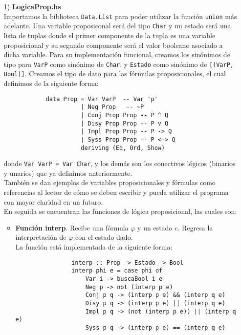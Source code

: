 \documentclass[letterpaper,12pt]{article}
\begin{document}
    \begin{itemize}
        \item[1)] \textbf{LogicaProp.hs} \\
        Importamos la biblioteca \texttt{Data.List} para poder utilizar 
        la función \texttt{union} más adelante. Una variable proposiconal 
        será del tipo \texttt{Char} y un estado será una lista de tuplas donde 
        el primer componente de la tupla es una variable proposicional y su 
        segundo componente será el valor booleano asociado a dicha variable.
        Para su implementación funcional, creamos los sinónimos de tipo para 
        \texttt{VarP} como sinónimo de \texttt{Char}, y \texttt{Estado} como 
        sinónimo de \texttt{[(VarP, Bool)]}. Creamos el tipo de dato para las 
        fórmulas proposicionales, el cual definimos de la siguiente forma:
        \begin{lstlisting}
            data Prop = Var VarP  -- Var 'p'
                      | Neg Prop   -- ~P
                      | Conj Prop Prop -- P ^ Q
                      | Disy Prop Prop -- P v Q
                      | Impl Prop Prop -- P -> Q
                      | Syss Prop Prop -- P <-> Q
                      deriving (Eq, Ord, Show)
        \end{lstlisting}

        donde \texttt{Var VarP = Var Char}, y los demás son los conectivos 
        lógicos (binarios y unarios) que ya definimos anteriormente. \\
        También se dan ejemplos de variables proposicionales y fórmulas 
        como referencias al lector de cómo se deben escribir y pueda utilizar 
        el programa con mayor claridad en un futuro. \\ 
        En seguida se encuentran las funciones de lógica proposicional, las
        cuales son:

        \newpage
        \begin{itemize}
            \item \textbf{Función interp}. Recibe una fórmula $\varphi$ y un 
            estado $e$. Regresa la interpretación de $\varphi$ con el estado 
            dado.\\
            La función está implementada de la siguiente forma:
            \begin{lstlisting}
                interp :: Prop -> Estado -> Bool
                interp phi e = case phi of 
                    Var i -> buscaBool i e
                    Neg p -> not (interp p e)
                    Conj p q -> (interp p e) && (interp q e)
                    Disy p q -> (interp p e) || (interp q e)
                    Impl p q -> (not (interp p e)) || (interp q e)
                    Syss p q -> (interp p e) == (interp q e)
            \end{lstlisting}


\end{itemize}
\end{itemize}
\end{document}
